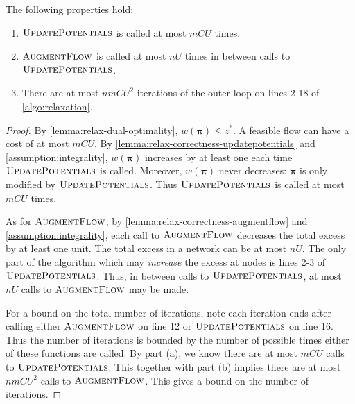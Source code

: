 \begin{lemma} \label{lemma:relax-iterations} 
The following properties hold:
\begin{enumerate}[label=(\alph*)]
    \item $\textproc{UpdatePotentials}$ is called at most $mCU$ times.
    \item $\textproc{AugmentFlow}$ is called at most $nU$ times in between calls to $\textproc{UpdatePotentials}$.
    \item There are at most $nmCU^2$ iterations of the outer loop on lines 2-18 of \cref{algo:relaxation}.
\end{enumerate}
\end{lemma}
\begin{proof}
By \cref{lemma:relax-dual-optimality}, $w\left(\boldsymbol{\pi}\right) \leq z^*$. A feasible flow can have a cost of at most $mCU$. By \cref{lemma:relax-correctness-updatepotentials} and \cref{assumption:integrality}, $w\left(\boldsymbol{\pi}\right)$ increases by at least one each time $\textproc{UpdatePotentials}$ is called. Moreover, $w\left(\boldsymbol{\pi}\right)$ never decreases: $\boldsymbol{\pi}$ is only modified by $\textproc{UpdatePotentials}$. Thus $\textproc{UpdatePotentials}$ is called at most $mCU$ times.

As for $\textproc{AugmentFlow}$, by \cref{lemma:relax-correctness-augmentflow} and \cref{assumption:integrality}, each call to $\textproc{AugmentFlow}$ decreases the total excess by at least one unit. The total excess in a network can be at most $nU$. The only part of the algorithm which may \emph{increase} the excess at nodes is lines 2-3 of $\textproc{UpdatePotentials}$. Thus, in between calls to $\textproc{UpdatePotentials}$, at most $nU$ calls to $\textproc{AugmentFlow}$ may be made.

For a bound on the total number of iterations, note each iteration ends after calling either $\textproc{AugmentFlow}$ on line 12 or $\textproc{UpdatePotentials}$ on line 16\footnotemark. Thus the number of iterations is bounded by the number of possible times either of these functions are called. By part (a), we know there are at most $mCU$ calls to $\textproc{UpdatePotentials}$. This together with part (b) implies there are at most $nmCU^2$ calls to $\textproc{AugmentFlow}$. This gives a bound on the number of iterations.
\end{proof}

